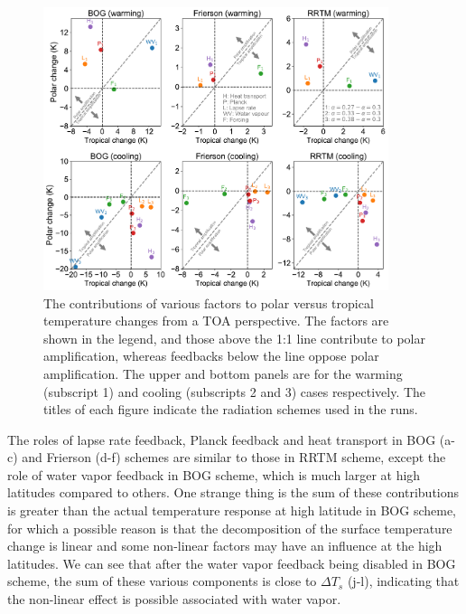  \begin{figure}[ht]
    \centering
	\includegraphics[width=0.9\textwidth]{figs/polar_amp/contributions_to_polar_amplification.pdf}
	\caption[The contributions of various factors to polar versus tropical temperature changes from a TOA perspective]{The contributions of various factors to polar versus tropical temperature changes from a TOA perspective. The factors are shown in the legend, and those above the 1:1 line contribute to polar amplification, whereas feedbacks below the line oppose polar amplification. The upper and bottom panels are for the warming (subscript 1) and cooling (subscripts 2 and 3) cases respectively. The titles of each figure indicate the radiation schemes used in the runs.}
	\label{fig:contribution_pole_vs_tropic}
\end{figure}

The roles of lapse rate feedback, Planck feedback and heat transport in BOG (a-c) and Frierson (d-f) schemes are similar to those in RRTM scheme, except the role of water vapor feedback in BOG scheme, which is much larger at high latitudes compared to others. One strange thing is the sum of these contributions is greater than the actual temperature response at high latitude in BOG scheme, for which a possible reason is that the decomposition of the surface temperature change is linear and some non-linear factors may have an influence at the high latitudes. We can see that after the water vapor feedback being disabled in BOG scheme, the sum of these various components is close to $\Delta T_s$ (j-l), indicating that the non-linear effect is possible associated with water vapor. 

